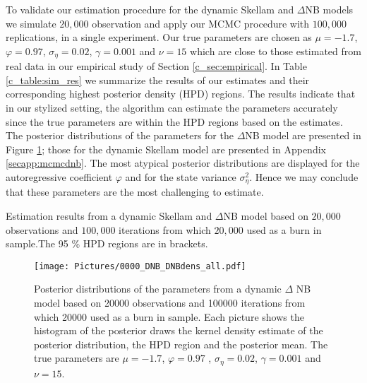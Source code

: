 \documentclass[12pt]{article}
\begin{document}
To validate our estimation procedure for the dynamic Skellam and $\Delta$NB models
we simulate $20,000$ observation and apply our MCMC procedure with $100,000$ replications,
in a single experiment.
Our true parameters are chosen as $\mu=-1.7$, $\varphi=0.97$, $\sigma _{\eta}=0.02$, $\gamma=0.001$
and $\nu=15$ which are close to those estimated from real data in our empirical study
of Section \ref{c_sec:empirical}.
In Table \ref{c_table:sim_res} we summarize the results of our estimates and their
corresponding highest posterior density (HPD) regions.
The results indicate that in our stylized setting,
the algorithm can estimate the parameters accurately since the
true parameters are within the HPD regions based on the estimates.
The posterior distributions of the parameters for the $\Delta$NB model are
presented in Figure \ref{c_pic:dnb_res_pic};
those for the dynamic Skellam model are presented in Appendix \ref{secapp:mcmcdnb}.
The most atypical posterior distributions are displayed for the
autoregressive coefficient $\varphi$ and for the state variance $\sigma _{\eta} ^2$.
Hence we may conclude that these parameters are the most challenging to estimate.  



\begin{table}[!htp]
\begin{center}
\caption{Estimation results from a dynamic Skellam and $\Delta$NB model based on
$20,000$ observations and $100,000$ iterations from which $20,000$ used
as a burn in sample.The 95 \% HPD regions are in brackets.}

\label{c_table:sim_res}
\end{center}
\end{table}


\begin{figure}[!htp]
  \centering 
\texttt{[image: Pictures/0000\_DNB\_DNBdens\_all.pdf]}
       \caption{Posterior distributions of the parameters from a dynamic $\Delta$ NB model based on 20000 observations and 100000 iterations from which 20000 used as a burn in sample. Each picture shows the histogram of the posterior draws the kernel density estimate of the posterior distribution, the HPD region and the posterior mean. The true parameters are   $\mu=-1.7$, $\varphi=0.97$ , $\sigma _{\eta}=0.02$, $\gamma=0.001$ and $\nu=15$. }
 \label{c_pic:dnb_res_pic}
 \end{figure}  
\end{document}
